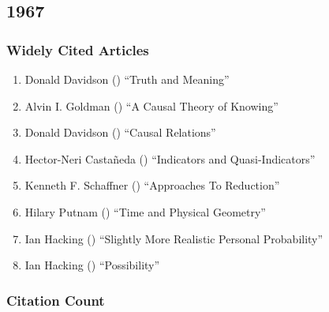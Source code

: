 \documentclass[
  10pt,
  letterpaper,
  DIV=11,
  numbers=noendperiod,
  twoside]{scrartcl}
\providecommand{\tightlist}{%
  \setlength{\itemsep}{0pt}\setlength{\parskip}{0pt}}\usepackage{longtable,booktabs,array}
\begin{document}
\newpage

\subsection{1967}\label{sec-s1967}

\subsubsection*{Widely Cited Articles}\label{widely-cited-articles-10}

\begin{enumerate}
\def\labelenumi{\arabic{enumi}.}
\tightlist
\item
  Donald Davidson () ``Truth and
  Meaning''
\item
  Alvin I. Goldman () ``A Causal
  Theory of Knowing''
\item
  Donald Davidson () ``Causal
  Relations''
\item
  Hector-Neri Castañeda ()
  ``Indicators and Quasi-Indicators''
\item
  Kenneth F. Schaffner ()
  ``Approaches To Reduction''
\item
  Hilary Putnam () ``Time and
  Physical Geometry''
\item
  Ian Hacking () ``Slightly More
  Realistic Personal Probability''
\item
  Ian Hacking () ``Possibility''
\end{enumerate}

\subsubsection*{Citation Count}\label{sec-count-1967}
\end{document}
